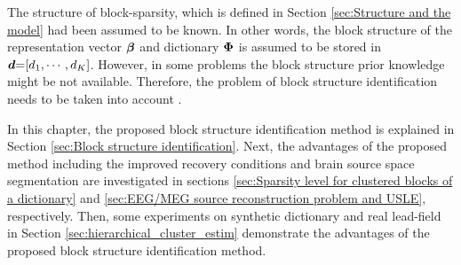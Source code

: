 The structure of block-sparsity, which is defined in Section \ref{sec:Structure and the model} had been assumed to be known.
In other words, the block structure of the representation vector $\boldsymbol{\beta}$ and dictionary $\boldsymbol{\Phi}$ is assumed to be stored in $\boldsymbol{d} {=} [d_1, \cdots, d_K]$.
However, in some problems the block structure prior knowledge might be not available.
Therefore, the problem of block structure identification needs to be taken into account \cite{Eksioglu2011}.

In this chapter, the proposed block structure identification method is explained in Section \ref{sec:Block structure identification}.
Next, the advantages of the proposed method including the improved recovery conditions and brain source space segmentation are investigated in sections \ref{sec:Sparsity level for clustered blocks of a dictionary} and \ref{sec:EEG/MEG source reconstruction problem and USLE}, respectively.
Then, some experiments on synthetic dictionary and real lead-field in Section \ref{sec:hierarchical_cluster_estim} demonstrate the advantages of the proposed block structure identification method.
